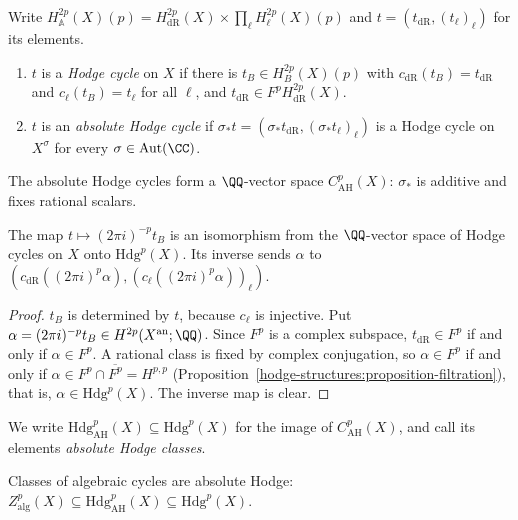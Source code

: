\begin{definition}[Deligne]\label{absolute-hodge:definition-hodge-cycle}
Write $H^{2p}_{\mathbb{A}}(X)(p) = H^{2p}_{\mathrm{dR}}(X) \times \prod_\ell H^{2p}_\ell(X)(p)$ and $t = (t_{\mathrm{dR}}, (t_\ell)_\ell)$ for its elements.
\begin{enumerate}
\item $t$ is a \emph{Hodge cycle} on $X$ if there is $t_B \in H^{2p}_B(X)(p)$ with $c_{\mathrm{dR}}(t_B) = t_{\mathrm{dR}}$ and $c_\ell(t_B) = t_\ell$ for all $\ell$, and $t_{\mathrm{dR}} \in F^pH^{2p}_{\mathrm{dR}}(X)$.
\item $t$ is an \emph{absolute Hodge cycle} if $\sigma_*t = (\sigma_*t_{\mathrm{dR}}, (\sigma_*t_\ell)_\ell)$ is a Hodge cycle on $X^\sigma$ for every $\sigma \in \mathrm{Aut}(\CC)$.
\end{enumerate}
The absolute Hodge cycles form a $\QQ$-vector space $C^p_{\mathrm{AH}}(X)$: $\sigma_*$ is additive and fixes rational scalars.
\end{definition}

\begin{lemma}\label{absolute-hodge:lemma-hodge-cycles}
The map $t \mapsto (2\pi i)^{-p}t_B$ is an isomorphism from the $\QQ$-vector space of Hodge cycles on $X$ onto $\mathrm{Hdg}^p(X)$. Its inverse sends $\alpha$ to
$(c_{\mathrm{dR}}((2\pi i)^p\alpha), (c_\ell((2\pi i)^p\alpha))_\ell)$.
\end{lemma}

\begin{proof}
$t_B$ is determined by $t$, because $c_\ell$ is injective. Put $\alpha = (2\pi i)^{-p}t_B \in H^{2p}(X^{\mathrm{an}}; \QQ)$. Since $F^p$ is a complex subspace, $t_{\mathrm{dR}} \in F^p$ if and only if $\alpha \in F^p$.
A rational class is fixed by complex conjugation, so $\alpha \in F^p$ if and only if $\alpha \in F^p \cap \overline{F^p} = H^{p,p}$ (Proposition~\ref{hodge-structures:proposition-filtration}), that is,
$\alpha \in \mathrm{Hdg}^p(X)$. The inverse map is clear.
\end{proof}

We write $\mathrm{Hdg}^p_{\mathrm{AH}}(X) \subseteq \mathrm{Hdg}^p(X)$ for the image of $C^p_{\mathrm{AH}}(X)$, and call its elements \emph{absolute Hodge classes}.

\begin{proposition}\label{absolute-hodge:proposition-algebraic}
Classes of algebraic cycles are absolute Hodge: $Z^p_{\mathrm{alg}}(X) \subseteq \mathrm{Hdg}^p_{\mathrm{AH}}(X) \subseteq \mathrm{Hdg}^p(X)$.
\end{proposition}


